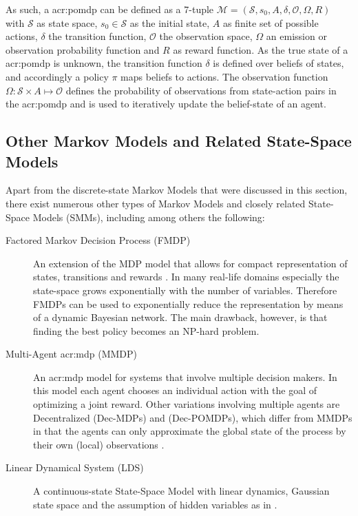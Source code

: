 As such, a \acrshort{acr:pomdp} can be defined as a 7-tuple $\mathcal{M} = (\mathcal{S}, s_0, A, \delta, \mathcal{O}, \Omega, R)$ with $\mathcal{S}$ as state space, $s_0 \in \mathcal{S}$ as the initial state, $A$ as finite set of possible actions, $\delta$ the transition function, $\mathcal{O}$ the observation space, $\Omega$ an emission or observation probability function and $R$ as reward function.
As the true state of a \acrshort{acr:pomdp} is unknown, the transition function $\delta$ is defined over beliefs of states, and accordingly a policy $\pi$ maps beliefs to actions.
The observation function $\Omega: \mathcal{S}\times A \mapsto \mathcal{O}$ defines the probability of observations from state-action pairs in the \acrshort{acr:pomdp} and is used to iteratively update the belief-state of an agent.

\subsection{Other Markov Models and Related State-Space Models}
\label{subsec:other-markov-models}
Apart from the discrete-state Markov Models that were discussed in this section, there exist numerous other types of Markov Models and closely related State-Space Models (SMMs), including among others the following:%

\begin{description}
	\item[Factored Markov Decision Process (FMDP)] An extension of the MDP model that allows for compact representation of states, transitions and rewards \cite{Degris2010}. In many real-life domains especially the state-space grows exponentially with the number of variables. Therefore FMDPs can be used to exponentially reduce the representation by means of a dynamic Bayesian network. The main drawback, however, is that finding the best policy becomes an NP-hard problem.
	\item[Multi-Agent \acrshort{acr:mdp} (MMDP)] An \acrshort{acr:mdp} model for systems that involve multiple decision makers. In this model each agent chooses an individual action with the goal of optimizing a joint reward. Other variations involving multiple agents are Decentralized  (Dec-MDPs) and  (Dec-POMDPs), which differ from MMDPs in that the agents can only approximate the global state of the process by their own (local) observations \cite{Melo20111757}.
	\item[Linear Dynamical System (LDS)] A continuous-state State-Space Model with linear dynamics, Gaussian state space and the assumption of hidden variables as in  \cite{Minka1999, barberBRML2012, Ghahramani2000}.
\end{description}

